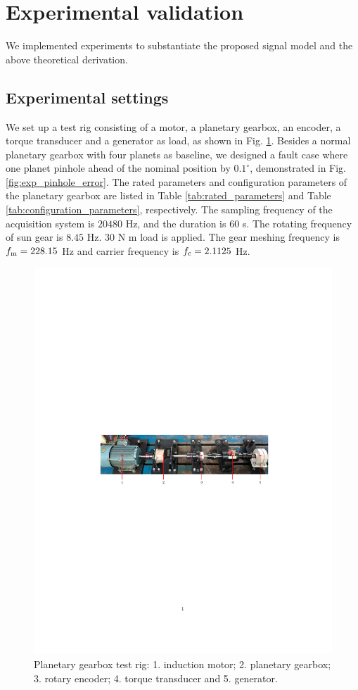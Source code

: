 \documentclass[a4paper,fleqn]{cas-sc}%
\begin{document}
\section{Experimental validation\label{sec:experimental_validation}}
We implemented experiments to substantiate the proposed signal model and the above theoretical derivation.
\subsection{Experimental settings}
\par We set up a test rig consisting of a motor, a planetary gearbox, an encoder,  a torque transducer and a generator as load, as shown in Fig. \ref{fig:test_rig}. Besides a normal planetary gearbox with four planets as baseline,  we designed a fault case where one planet pinhole ahead of the nominal position by $0.1^{\circ}$, demonstrated in Fig. \ref{fig:exp_pinhole_error}. The rated parameters and configuration parameters of the planetary gearbox are listed in Table \ref{tab:rated_parameters} and Table \ref{tab:configuration_parameters}, respectively. The sampling frequency of the acquisition system is $20480$ Hz, and the duration is $60$ s. The rotating frequency of sun gear is $8.45$ Hz. $30$ N m load is applied. The gear meshing frequency is $f_{\rm m}=228.15$ Hz and carrier frequency is $f_{\rm c}=2.1125$ Hz.
\begin{figure}[pos=htbp]
    \centering
    \includegraphics{test_rig_configuration.pdf}
    \caption{Planetary gearbox test rig: 1. induction motor; 2. planetary gearbox; 3. rotary encoder; 4. torque transducer and 5. generator.}
    \label{fig:test_rig}
\end{figure} 
\end{document}
